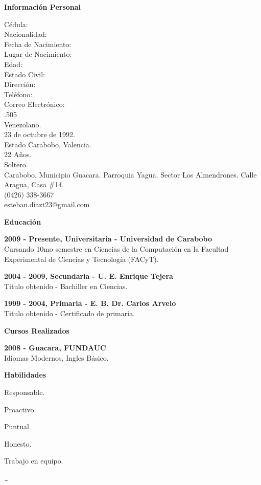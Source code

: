\documentclass[a4paper,12pt,final]{memoir}
\newcommand{\Sep}{\vspace{1.5em}}
\newcommand{\SmallSep}{\vspace{0.5em}}
\newcommand{\CVSection}[1]
	{\Large\textbf{#1}\par
	\SmallSep\normalsize\normalfont}
\newcommand{\CVItem}[1]
	{\textbf{\color{RoyalBlue} #1}}
\begin{document}
\CVSection{Información Personal}
\begin{multicols}{2}
Cédula: \\
Nacionalidad: \\
Fecha de Nacimiento: \\
Lugar de Nacimiento: \\
Edad: \\
Estado Civil: \\
Dirección: \\
\newline
\newline
Teléfono: \\
Correo Electrónico: \\
\vfill
{}.505\\
Venezolano.\\
23 de octubre de 1992.\\
Estado Carabobo, Valencia. \\
22 Años.\\
Soltero.\\
Carabobo. Municipio Guacara. Parroquia Yagua. Sector Los Almendrones.
Calle Aragua, Casa \#14.\\
(0426) 338-3667 \\
esteban.diazt23@gmail.com
\end{multicols}
\Sep
\CVSection{Educación}
\CVItem{2009 - Presente, Universitaria - Universidad de Carabobo}\\
Cursando 10mo semestre en Ciencias de la Computación en la Facultad Experimental
de Ciencias y Tecnología (FACyT).
\SmallSep

\CVItem{2004 - 2009, Secundaria - U. E. Enrique Tejera}\\
Titulo obtenido - Bachiller en Ciencias.
\SmallSep

\CVItem{1999 - 2004, Primaria - E. B. Dr. Carlos Arvelo}\\
Titulo obtenido - Certificado de primaria.

\Sep

\CVSection{Cursos Realizados}
\CVItem{2008 - Guacara, FUNDAUC}\\
Idiomas Modernos, Ingles Básico.
\Sep


\CVSection{Habilidades}
\begin{multicols}{3}
\begin{compactitem}[\color{RoyalBlue}$\circ$]
	\item Responsable.
	\item Proactivo. 
	\item Puntual.
	\item Honesto.
	\item Trabajo en equipo.
	\item \dots
\end{compactitem}
\end{multicols}
\SmallSep
\end{document}
